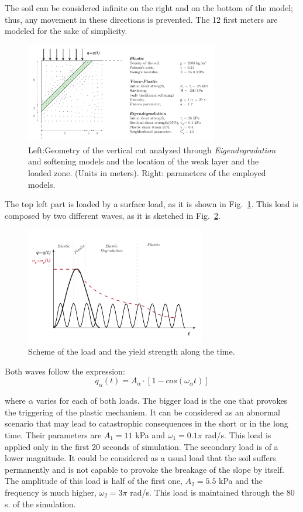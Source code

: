 \documentclass[applsci,journal,article,submit,moreauthors,pdftex]{Definitions/mdpi}
\begin{document}
The soil can be considered infinite on the right and on the bottom of the model; thus, any movement in these directions is prevented. The 12 first meters are modeled for the sake of simplicity.

\begin{figure}
\includegraphics[width=0.75\textwidth]{Figs/geo_VC.pdf}
\caption{Left:Geometry of the vertical cut analyzed through \emph{Eigendegradation} and softening models and the location of the weak layer and the loaded zone. (Units in meters). Right: parameters of the employed models.} 
\label{fig_VC1}
\end{figure}

The top left part is loaded by a surface load, as it is shown in Fig.~\ref{fig_VC1}. This load is composed by two different waves, as it is sketched in Fig.~\ref{fig_VC2}.

\begin{figure}
\includegraphics[width=0.7\textwidth]{Figs/carga_VC.pdf}
\caption{Scheme of the load and the yield strength along the time.}
\label{fig_VC2}
\end{figure}

Both waves follow the expression:
$$
q_\alpha(t)=A_{\alpha}\cdot\left[1-cos(\omega_{\alpha}t)\right]
$$

where $\alpha$ varies for each of both loads. The bigger load is the one that provokes the triggering of the plastic mechanism. It can be considered as an abnormal scenario that may lead to catastrophic consequences in the short or in the long time. Their parameters are $A_1=11$ kPa and $\omega_1=0.1\pi$ rad/s. This load is applied only in the first 20 seconds of simulation. The secondary load is of a lower magnitude. It could be considered as a usual load that the soil suffers permanently and is not capable to provoke the breakage of the slope by itself. The amplitude of this load is half of the first one, $A_2=5.5$ kPa and the frequency is much higher, $\omega_2=3\pi$ rad/s. This load is maintained through the 80 s. of the simulation.
\end{document}
